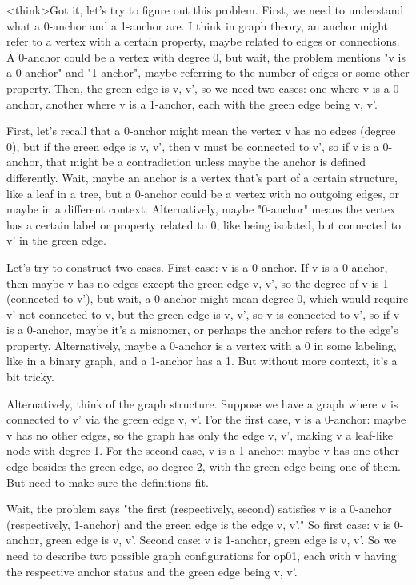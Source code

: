 <think>Got it, let's try to figure out this problem. First, we need to understand what a 0-anchor and a 1-anchor are. I think in graph theory, an anchor might refer to a vertex with a certain property, maybe related to edges or connections. A 0-anchor could be a vertex with degree 0, but wait, the problem mentions "v is a 0-anchor" and "1-anchor", maybe referring to the number of edges or some other property. Then, the green edge is {v, v'}, so we need two cases: one where v is a 0-anchor, another where v is a 1-anchor, each with the green edge being {v, v'}.

First, let's recall that a 0-anchor might mean the vertex v has no edges (degree 0), but if the green edge is {v, v'}, then v must be connected to v', so if v is a 0-anchor, that might be a contradiction unless maybe the anchor is defined differently. Wait, maybe an anchor is a vertex that's part of a certain structure, like a leaf in a tree, but a 0-anchor could be a vertex with no outgoing edges, or maybe in a different context. Alternatively, maybe "0-anchor" means the vertex has a certain label or property related to 0, like being isolated, but connected to v' in the green edge.

Let's try to construct two cases. First case: v is a 0-anchor. If v is a 0-anchor, then maybe v has no edges except the green edge {v, v'}, so the degree of v is 1 (connected to v'), but wait, a 0-anchor might mean degree 0, which would require v' not connected to v, but the green edge is {v, v'}, so v is connected to v', so if v is a 0-anchor, maybe it's a misnomer, or perhaps the anchor refers to the edge's property. Alternatively, maybe a 0-anchor is a vertex with a 0 in some labeling, like in a binary graph, and a 1-anchor has a 1. But without more context, it's a bit tricky.

Alternatively, think of the graph structure. Suppose we have a graph where v is connected to v' via the green edge {v, v'}. For the first case, v is a 0-anchor: maybe v has no other edges, so the graph has only the edge {v, v'}, making v a leaf-like node with degree 1. For the second case, v is a 1-anchor: maybe v has one other edge besides the green edge, so degree 2, with the green edge being one of them. But need to make sure the definitions fit.

Wait, the problem says "the first (respectively, second) satisfies v is a 0-anchor (respectively, 1-anchor) and the green edge is the edge {v, v'}." So first case: v is 0-anchor, green edge is {v, v'}. Second case: v is 1-anchor, green edge is {v, v'}. So we need to describe two possible graph configurations for op01, each with v having the respective anchor status and the green edge being {v, v'}.

